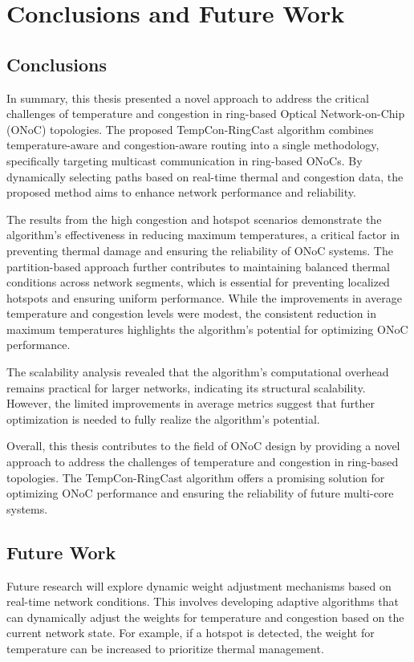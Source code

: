 \documentclass[12pt]{article}
\begin{document}
\newpage

\chapter{Conclusions and Future Work}

\section{Conclusions}
In summary, this thesis presented a novel approach to address the critical challenges of temperature and congestion in ring-based Optical Network-on-Chip (ONoC) topologies. The proposed TempCon-RingCast algorithm combines temperature-aware and congestion-aware routing into a single methodology, specifically targeting multicast communication in ring-based ONoCs. By dynamically selecting paths based on real-time thermal and congestion data, the proposed method aims to enhance network performance and reliability.

The results from the high congestion and hotspot scenarios demonstrate the algorithm's effectiveness in reducing maximum temperatures, a critical factor in preventing thermal damage and ensuring the reliability of ONoC systems. The partition-based approach further contributes to maintaining balanced thermal conditions across network segments, which is essential for preventing localized hotspots and ensuring uniform performance. While the improvements in average temperature and congestion levels were modest, the consistent reduction in maximum temperatures highlights the algorithm's potential for optimizing ONoC performance.

The scalability analysis revealed that the algorithm's computational overhead remains practical for larger networks, indicating its structural scalability. However, the limited improvements in average metrics suggest that further optimization is needed to fully realize the algorithm's potential.

Overall, this thesis contributes to the field of ONoC design by providing a novel approach to address the challenges of temperature and congestion in ring-based topologies. The TempCon-RingCast algorithm offers a promising solution for optimizing ONoC performance and ensuring the reliability of future multi-core systems.

\section{Future Work}
Future research will explore dynamic weight adjustment mechanisms based on real-time network conditions. This involves developing adaptive algorithms that can dynamically adjust the weights for temperature and congestion based on the current network state. For example, if a hotspot is detected, the weight for temperature can be increased to prioritize thermal management.
\end{document}
